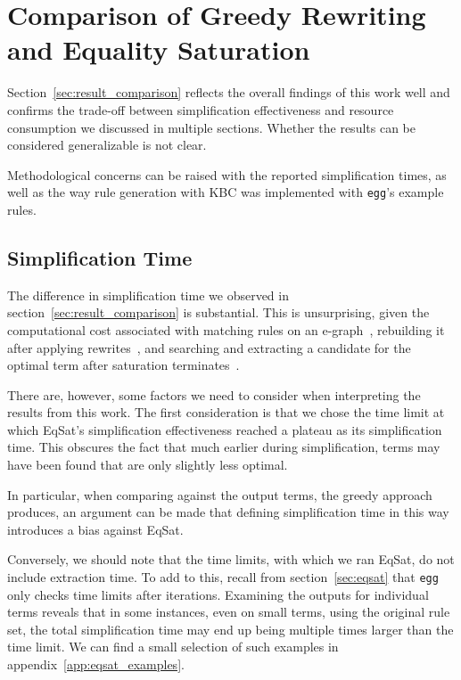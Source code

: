 \section{Comparison of Greedy Rewriting and Equality Saturation}
Section~\ref{sec:result_comparison} reflects the overall findings of this work well and confirms the trade-off between simplification effectiveness and resource consumption we discussed in multiple sections. Whether the results can be considered generalizable is not clear.

Methodological concerns can be raised with the reported simplification times, as well as the way rule generation with KBC was implemented with \texttt{egg}'s example rules.

\subsection{Simplification Time}
\label{sec:discussion_time}
The difference in simplification time we observed in section~\ref{sec:result_comparison} is  substantial. This is unsurprising, given the computational cost associated with matching rules on an e-graph~\citep{Willsey_2022}, rebuilding it after applying rewrites~\citep{Willsey_2021}, and searching and extracting a candidate for the optimal term after saturation terminates~\citep{yin2025eboostboostedegraphextraction}.

There are, however, some factors we need to consider when interpreting the results from this work. The first consideration is that we chose the time limit at which EqSat's simplification effectiveness reached a plateau as its simplification time. This obscures the fact that much earlier during simplification, terms may have been found that are only slightly less optimal.

In particular, when comparing against the output terms, the greedy approach produces, an argument can be made that defining simplification time in this way introduces a bias against EqSat.

Conversely, we should note that the time limits, with which we ran EqSat, do not include extraction time. To add to this, recall from section~\ref{sec:eqsat} that \texttt{egg} only checks time limits after iterations. Examining the outputs for individual terms reveals that in some instances, even on small terms, using the original rule set, the total simplification time may end up being multiple times larger than the time limit. We can find a small selection of such examples in appendix~\ref{app:eqsat_examples}.

